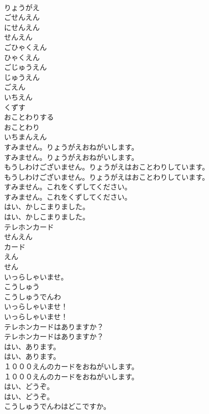 \documentclass[8pt]{extreport}
\begin{document}
\begin{CJK}{UTF8}{min}
\\	りょうがえ
\\	ごせんえん
\\	にせんえん
\\	せんえん
\\	ごひゃくえん
\\	ひゃくえん
\\	ごじゅうえん
\\	じゅうえん
\\	ごえん
\\	いちえん
\\	くずす
\\	おことわりする
\\	おことわり
\\	いちまんえん
\\	すみません。りょうがえおねがいします。	
\\	すみません。りょうがえおねがいします。 
\\	もうしわけございません。りょうがえはおことわりしています。	
\\	もうしわけございません。りょうがえはおことわりしています。 
\\	すみません。これをくずしてください。	
\\	すみません。これをくずしてください。 
\\	はい、かしこまりました。	
\\	はい、かしこまりました。 
\\	テレホンカード
\\	せんえん
\\	カード
\\	えん
\\	せん
\\	いっらしゃいませ。
\\	こうしゅう
\\	こうしゅうでんわ
\\	いっらしゃいませ！	
\\	いっらしゃいませ！ 
\\	テレホンカードはありますか？	
\\	テレホンカードはありますか？ 
\\	はい、あります。	
\\	はい、あります。 
\\	１０００えんのカードをおねがいします。	
\\	１０００えんのカードをおねがいします。 
\\	はい、どうぞ。	
\\	はい、どうぞ。 
\\	こうしゅうでんわはどこですか。	

\end{CJK}
\end{document}
